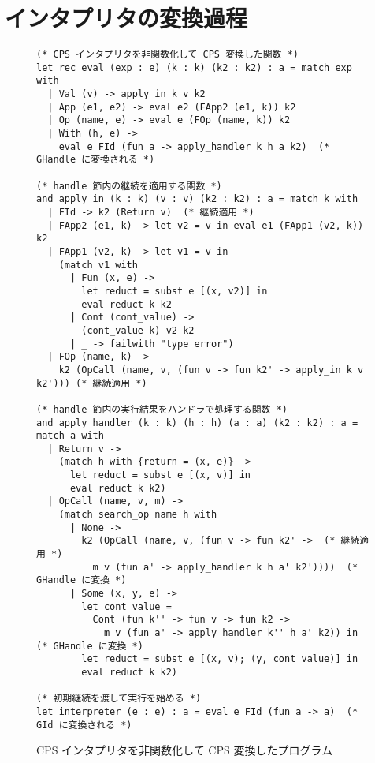 \chapter{インタプリタの変換過程}

\begin{figure}
  \begin{spacing}{0.8}
\begin{verbatim}
(* CPS インタプリタを非関数化して CPS 変換した関数 *)
let rec eval (exp : e) (k : k) (k2 : k2) : a = match exp with
  | Val (v) -> apply_in k v k2
  | App (e1, e2) -> eval e2 (FApp2 (e1, k)) k2
  | Op (name, e) -> eval e (FOp (name, k)) k2
  | With (h, e) ->
    eval e FId (fun a -> apply_handler k h a k2)  (* GHandle に変換される *)

(* handle 節内の継続を適用する関数 *)
and apply_in (k : k) (v : v) (k2 : k2) : a = match k with
  | FId -> k2 (Return v)  (* 継続適用 *)
  | FApp2 (e1, k) -> let v2 = v in eval e1 (FApp1 (v2, k)) k2
  | FApp1 (v2, k) -> let v1 = v in
    (match v1 with
      | Fun (x, e) ->
        let reduct = subst e [(x, v2)] in
        eval reduct k k2
      | Cont (cont_value) ->
        (cont_value k) v2 k2
      | _ -> failwith "type error")
  | FOp (name, k) ->
    k2 (OpCall (name, v, (fun v -> fun k2' -> apply_in k v k2'))) (* 継続適用 *)

(* handle 節内の実行結果をハンドラで処理する関数 *)
and apply_handler (k : k) (h : h) (a : a) (k2 : k2) : a = match a with
  | Return v ->
    (match h with {return = (x, e)} ->
      let reduct = subst e [(x, v)] in
      eval reduct k k2)
  | OpCall (name, v, m) ->
    (match search_op name h with
      | None ->
        k2 (OpCall (name, v, (fun v -> fun k2' ->  (* 継続適用 *)
          m v (fun a' -> apply_handler k h a' k2'))))  (* GHandle に変換 *)
      | Some (x, y, e) ->
        let cont_value =
          Cont (fun k'' -> fun v -> fun k2 ->
            m v (fun a' -> apply_handler k'' h a' k2)) in  (* GHandle に変換 *)
        let reduct = subst e [(x, v); (y, cont_value)] in
        eval reduct k k2)

(* 初期継続を渡して実行を始める *)
let interpreter (e : e) : a = eval e FId (fun a -> a)  (* GId に変換される *)
\end{verbatim}
\end{spacing}
\caption{CPS インタプリタを非関数化して CPS 変換したプログラム}
\label{figure:3cps}
\end{figure}


